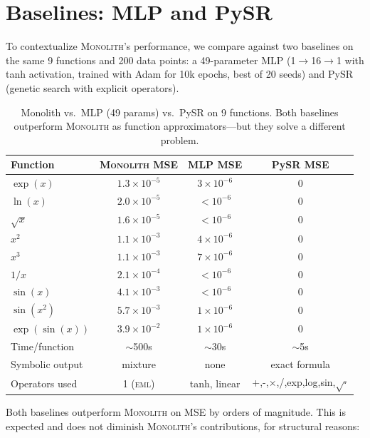 \documentclass[11pt,a4paper]{article}
\newcommand{\eml}{\textsc{eml}}
\newcommand{\monolith}{\textsc{Monolith}}
\begin{document}
\section{Baselines: MLP and PySR}
\label{sec:comparison}

To contextualize \monolith{}'s performance, we compare against two baselines on the same 9 functions and 200 data points: a 49-parameter MLP (1$\to$16$\to$1 with tanh activation, trained with Adam for 10k epochs, best of 20 seeds) and PySR~\citep{cranmer2023pysr} (genetic search with explicit operators).

\begin{table}[ht]
\centering
\caption{Monolith vs.\ MLP (49 params) vs.\ PySR on 9 functions. Both baselines outperform \monolith{} as function approximators---but they solve a different problem.}
\label{tab:baselines}
\begin{tabular}{lccc}
\toprule
Function & \monolith{} MSE & MLP MSE & PySR MSE \\
\midrule
$\exp(x)$ & $1.3 \times 10^{-5}$ & $3 \times 10^{-6}$ & 0 \\
$\ln(x)$ & $2.0 \times 10^{-5}$ & $< 10^{-6}$ & 0 \\
$\sqrt{x}$ & $1.6 \times 10^{-5}$ & $< 10^{-6}$ & 0 \\
$x^2$ & $1.1 \times 10^{-3}$ & $4 \times 10^{-6}$ & 0 \\
$x^3$ & $1.1 \times 10^{-3}$ & $7 \times 10^{-6}$ & 0 \\
$1/x$ & $2.1 \times 10^{-4}$ & $< 10^{-6}$ & 0 \\
$\sin(x)$ & $4.1 \times 10^{-3}$ & $< 10^{-6}$ & 0 \\
$\sin(x^2)$ & $5.7 \times 10^{-3}$ & $1 \times 10^{-6}$ & 0 \\
$\exp(\sin(x))$ & $3.9 \times 10^{-2}$ & $1 \times 10^{-6}$ & 0 \\
\midrule
Time/function & $\sim$500s & $\sim$30s & $\sim$5s \\
Symbolic output & mixture & none & exact formula \\
Operators used & 1 (\eml) & tanh, linear & +,-,$\times$,/,exp,log,sin,$\sqrt{\cdot}$ \\
\bottomrule
\end{tabular}
\end{table}

Both baselines outperform \monolith{} on MSE by orders of magnitude.
This is expected and does not diminish \monolith{}'s contributions, for structural reasons:
\end{document}
